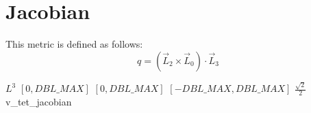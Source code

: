 \section{Jacobian\label{s:tet-jacobian}}

This metric is defined as follows:
\begin{displaymath}
q = \left( \vec L_2 \times \vec L_0 \right) \cdot \vec L_3  
\end{displaymath}

%
{$L^3$}%
{$[0,DBL\_MAX]$}%
{$[0,DBL\_MAX]$}%
{$[-DBL\_MAX,DBL\_MAX]$}%
{$\frac{\sqrt{2}}{2}$}%
{\cite{knu:03}}%
{v\_tet\_jacobian}%

